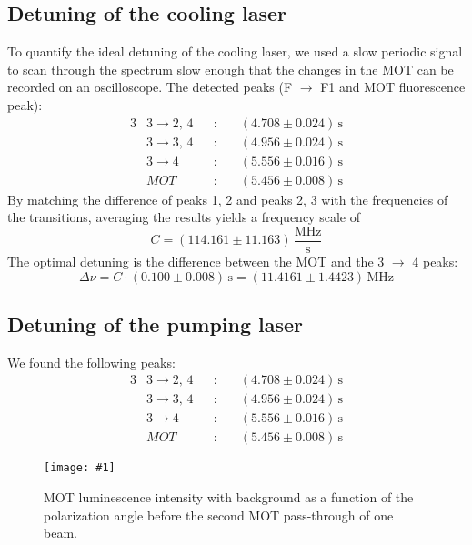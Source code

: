 \documentclass[twocolumn]{article}
\newcommand{\insertFigure}[1]{%
   \texttt{[image: \#1]}%
}
\begin{document}
\subsection{Detuning of the cooling laser}
To quantify the ideal detuning of the cooling laser, we used a slow periodic signal to scan through the spectrum slow enough that the changes in the MOT can be recorded on an oscilloscope. The detected peaks (F $\rightarrow$ F1 and MOT fluorescence peak):
\begin{alignat*}{3}
&3 \rightarrow 2, \, 4&&: \hspace{12pt} &(4.708 \pm 0.024) \, \text{s}\\
&3 \rightarrow 3, \, 4&&:  &(4.956 \pm 0.024) \, \text{s}\\
&3 \rightarrow 4&&:		 &(5.556 \pm 0.016)\, \text{s}\\
&MOT			&&:		&(5.456 \pm 0.008) \, \text{s}
\end{alignat*}
By matching the difference of peaks 1, 2 and peaks 2, 3 with the frequencies of the transitions, averaging the results yields a frequency scale of
\begin{equation}
C =(114.161 \pm 11.163)\, \frac{\text{MHz}}{\text{s}} \nonumber
\end{equation}
The optimal detuning is the difference between the MOT and the 3 $\rightarrow$ 4 peaks:
\begin{equation}\label{eqn:detuning}
\Delta \nu = C \cdot (0.100 \pm 0.008) \, \text{s} = (11.4161 \pm 1.4423) \, \text{MHz}
\end{equation}
\subsection{Detuning of the pumping laser}

We found the following peaks:
\begin{alignat*}{3}
&3 \rightarrow 2, \, 4&&: \hspace{12pt} &(4.708 \pm 0.024) \, \text{s}\\
&3 \rightarrow 3, \, 4&&:  &(4.956 \pm 0.024) \, \text{s}\\
&3 \rightarrow 4&&:		 &(5.556 \pm 0.016)\, \text{s}\\
&MOT			&&:		&(5.456 \pm 0.008) \, \text{s}
\end{alignat*}
\begin{figure}
\centering
\insertFigure{Images/Detuning_cooling.png}
\caption{MOT luminescence intensity with background as a function of the polarization angle before the second MOT pass-through of one beam.}
\label{fig:Detuning}
\end{figure}
\end{document}
